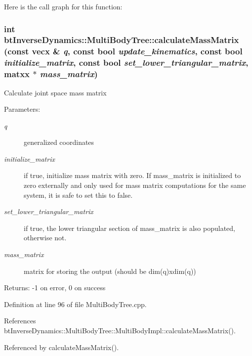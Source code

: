 Here is the call graph for this function:\hypertarget{classbt_inverse_dynamics_1_1_multi_body_tree_0a767d639bb90ad3b1cb529eb26baa75}{
\subsubsection[calculateMassMatrix]{\setlength{\rightskip}{0pt plus 5cm}int btInverseDynamics::MultiBodyTree::calculateMassMatrix (const vecx \& {\em q}, \/  const bool {\em update\_\-kinematics}, \/  const bool {\em initialize\_\-matrix}, \/  const bool {\em set\_\-lower\_\-triangular\_\-matrix}, \/  matxx $\ast$ {\em mass\_\-matrix})}}
\label{classbt_inverse_dynamics_1_1_multi_body_tree_0a767d639bb90ad3b1cb529eb26baa75}


Calculate joint space mass matrix \begin{Desc}
\item[Parameters:]
\begin{description}
\item[{\em q}]generalized coordinates \item[{\em initialize\_\-matrix}]if true, initialize mass matrix with zero. If mass\_\-matrix is initialized to zero externally and only used for mass matrix computations for the same system, it is safe to set this to false. \item[{\em set\_\-lower\_\-triangular\_\-matrix}]if true, the lower triangular section of mass\_\-matrix is also populated, otherwise not. \item[{\em mass\_\-matrix}]matrix for storing the output (should be dim(q)xdim(q)) \end{description}
\end{Desc}
\begin{Desc}
\item[Returns:]-1 on error, 0 on success \end{Desc}


Definition at line 96 of file MultiBodyTree.cpp.

References btInverseDynamics::MultiBodyTree::MultiBodyImpl::calculateMassMatrix().

Referenced by calculateMassMatrix().

